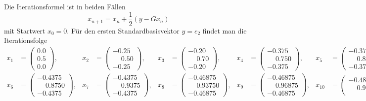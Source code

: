 \begin{beispiel}
Die Iterationsformel ist in beiden Fällen
\[
x_{n+1} = x_n + \frac12(y-Gx_n)
\]
mit Startwert $x_0=0$.
Für den ersten Standardbasisvektor $y=e_2$ findet man die Iterationsfolge
\begin{align*}
x_1 &=
\begin{pmatrix}
   0.0\\
   0.5\\
   0.0
\end{pmatrix},
&
x_2 &=
\begin{pmatrix}
  -0.25\\
 \phantom{-}  0.50\\
  -0.25
\end{pmatrix},
&
x_3 &=
\begin{pmatrix}
  -0.20\\
   \phantom{-}0.70\\
  -0.20
\end{pmatrix},
&
x_4 &=
\begin{pmatrix}
  -0.375\\
   \phantom{-}0.750\\
  -0.375
\end{pmatrix},
&
x_5 &=
\begin{pmatrix}
  -0.375\\
   \phantom{-}0.875\\
  -0.375
\end{pmatrix},
\\
x_6 &=
\begin{pmatrix}
  -0.4375\\
   \phantom{-}0.8750\\
  -0.4375
\end{pmatrix},
&
x_7 &=
\begin{pmatrix}
  -0.4375\\
   \phantom{-}0.9375\\
  -0.4375
\end{pmatrix},
&
x_8 &=
\begin{pmatrix}
  -0.46875\\
   \phantom{-}0.93750\\
  -0.46875
\end{pmatrix},
&
x_9 &=
\begin{pmatrix}
  -0.46875\\
   \phantom{-}0.96875\\
  -0.46875
\end{pmatrix},
&
x_{10} &=
\begin{pmatrix}
  -0.48438\\
   \phantom{-}0.96875\\

\end{pmatrix}
\end{align*}
\end{beispiel}

